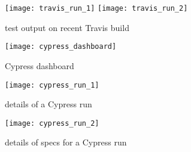 \documentclass{article}
\begin{document}
\begin{figure}[h]
    \centering
    \texttt{[image: travis\_run\_1]}
    \texttt{[image: travis\_run\_2]}
    \caption{test output on recent Travis build}
\end{figure}

\begin{figure}[h]
    \centering
    \texttt{[image: cypress\_dashboard]}
    \caption{Cypress dashboard}
\end{figure}

\begin{figure}[h]
    \centering
    \texttt{[image: cypress\_run\_1]}
    \caption{details of a Cypress run}
\end{figure}
\begin{figure}[h]
    \centering
    \texttt{[image: cypress\_run\_2]}
    \caption{details of specs for a Cypress run}
\end{figure}
\end{document}
